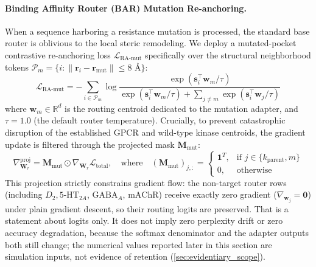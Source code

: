 \documentclass{article}
\theoremstyle{definition}
\begin{document}
\paragraph{Binding Affinity Router (BAR) Mutation Re-anchoring.}
When a sequence harboring a resistance mutation is processed, the standard base router is oblivious to the local steric remodeling. We deploy a mutated-pocket contrastive re-anchoring loss $\mathcal{L}_{\text{RA-mut}}$ specifically over the structural neighborhood tokens $\mathcal{P}_m = \{i : \|\mathbf{r}_i - \mathbf{r}_{\text{mut}}\| \le 8\text{ \AA}\}$:
\begin{equation}
\mathcal{L}_{\text{RA-mut}} = -\sum_{i \in \mathcal{P}_m} \log \frac{\exp\left(\mathbf{s}_i^\top \mathbf{w}_m / \tau\right)}{\exp\left(\mathbf{s}_i^\top \mathbf{w}_m / \tau\right) + \sum_{j \neq m} \exp\left(\mathbf{s}_i^\top \mathbf{w}_j / \tau\right)}
\label{eq:loss_ra_mut}
\end{equation}
where $\mathbf{w}_m \in \mathbb{R}^d$ is the routing centroid dedicated to the mutation adapter, and $\tau = 1.0$ (the default router temperature). Crucially, to prevent catastrophic disruption of the established GPCR and wild-type kinase centroids, the gradient update is filtered through the projected mask $\mathbf{M}_{\text{mut}}$:
\begin{equation}
\nabla_{\mathbf{W}_r}^{\text{proj}} = \mathbf{M}_{\text{mut}} \odot \nabla_{\mathbf{W}_r} \mathcal{L}_{\text{total}}, \quad \text{where} \quad (\mathbf{M}_{\text{mut}})_{j,:} = 
\begin{cases}
\mathbf{1}^T, & \text{if } j \in \{k_{\text{parent}}, m\} \\
0, & \text{otherwise}
\end{cases}
\label{eq:projected_mask_mut}
\end{equation}
This projection strictly constrains gradient flow: the non-target router rows (including $D_2, 5\text{-HT}_{2A}$, $\text{GABA}_A$, $\text{mAChR}$) receive exactly zero gradient ($\nabla_{\mathbf{w}_j} = \mathbf{0}$) under plain gradient descent, so their routing logits are preserved. That is a statement about logits only. It does not imply zero perplexity drift or zero accuracy degradation, because the softmax denominator and the adapter outputs both still change; the numerical values reported later in this section are simulation inputs, not evidence of retention (\cref{sec:evidentiary_scope}).
\end{document}
